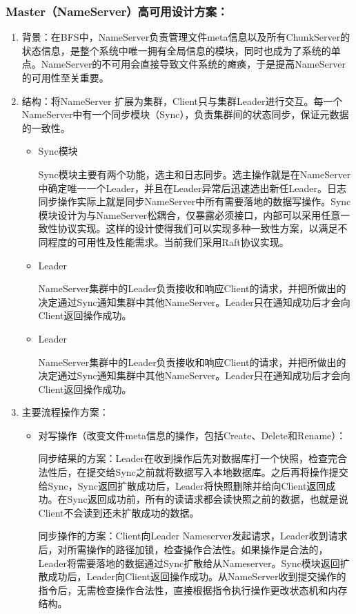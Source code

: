 \documentclass{ctexart}
\begin{document}
\subsubsection{Master（NameServer）高可用设计方案：}
\begin{enumerate}
	\item 背景：在BFS中，NameServer负责管理文件meta信息以及所有ChunkServer的状态信息，是整个系统中唯一拥有全局信息的模块，同时也成为了系统的单点。NameServer的不可用会直接导致文件系统的瘫痪，于是提高NameServer的可用性至关重要。
	\item 结构：将NameServer 扩展为集群，Client只与集群Leader进行交互。每一个NameServer中有一个同步模块（Sync），负责集群间的状态同步，保证元数据的一致性。
	\begin{itemize}
		\item Sync模块

		Sync模块主要有两个功能，选主和日志同步。选主操作就是在NameServer中确定唯一一个Leader，并且在Leader异常后迅速选出新任Leader。日志同步操作实际上就是同步NameServer中所有需要落地的数据写操作。Sync模块设计为与NameServer松耦合，仅暴露必须接口，内部可以采用任意一致性协议实现。这样的设计使得我们可以实现多种一致性方案，以满足不同程度的可用性及性能需求。当前我们采用Raft协议实现。
		\item Leader

		NameServer集群中的Leader负责接收和响应Client的请求，并把所做出的决定通过Sync通知集群中其他NameServer。Leader只在通知成功后才会向Client返回操作成功。
		\item Leader

		NameServer集群中的Leader负责接收和响应Client的请求，并把所做出的决定通过Sync通知集群中其他NameServer。Leader只在通知成功后才会向Client返回操作成功。
	\end{itemize}
	\item 主要流程操作方案：
	\begin{itemize}
		\item 对写操作（改变文件meta信息的操作，包括Create、Delete和Rename）：

		同步结果的方案：Leader在收到操作后先对数据库打一个快照，检查完合法性后，在提交给Sync之前就将数据写入本地数据库。之后再将操作提交给Sync，Sync返回扩散成功后，Leader将快照删除并给向Client返回成功。在Sync返回成功前，所有的读请求都会读快照之前的数据，也就是说Client不会读到还未扩散成功的数据。

		同步操作的方案：Client向Leader Nameserver发起请求，Leader收到请求后，对所需操作的路径加锁，检查操作合法性。如果操作是合法的，Leader将需要落地的数据通过Sync扩散给从Nameserver。Sync模块返回扩散成功后，Leader向Client返回操作成功。从NameServer收到提交操作的指令后，无需检查操作合法性，直接根据指令执行操作更改状态机和内存结构。


\end{itemize}
\end{enumerate}
\end{document}

